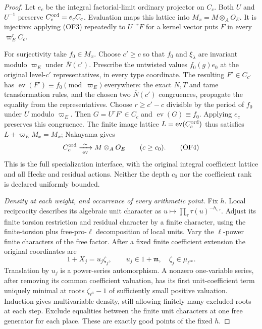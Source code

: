 \begin{proof}
Let $e_c$ be the integral factorial-limit ordinary projector on $C_c$.
Both $U$ and $U^{-1}$ preserve $C_c^{\rm ord}=e_cC_c$.
Evaluation maps this lattice into $M_x=M\otimes_A O_E$.  It is
injective: applying (OF3) repeatedly to $U^{-r}F$ for a kernel vector
puts $F$ in every $\varpi_E^rC_c$.

For surjectivity take $f_0\in M_x$.  Choose $c'\ge c$ so that
$f_0$ and $\xi_\lambda$ are invariant modulo $\varpi_E$ under
$\overline N(c')$.  Prescribe the untwisted values $f_0(g)e_0$
at the original level-$c'$ representatives, in every type coordinate.
The resulting $F'\in C_{c'}$ has
$\operatorname{ev}(F')\equiv f_0\pmod{\varpi_E}$ everywhere:
the exact $N,T$ and tame transformation rules, and the chosen two
$\overline N(c')$ congruences, propagate the equality from the
representatives.  Choose $r\ge c'-c$ divisible by the period of
$f_0$ under $U$ modulo $\varpi_E$.  Then $G=U^rF'\in C_c$ and
$\operatorname{ev}(G)\equiv f_0$.  Applying $e_c$ preserves this
congruence.  The finite image lattice $L=\operatorname{ev}(C_c^{\rm ord})$
thus satisfies $L+\varpi_E M_x=M_x$; Nakayama gives
\[
       C_c^{\rm ord}\xrightarrow[\operatorname{ev}]{\ \sim\ }
                     M\otimes_A O_E\qquad(c\ge c_0).             \tag{OF4}
\]
This is the full specialization interface, with the original integral
coefficient lattice and all Hecke and residual actions.  Neither
the depth $c_0$ nor the coefficient rank is declared uniformly bounded.

\emph{Density at each weight, and occurrence of every arithmetic point.}
Fix $h$.  Local reciprocity describes its algebraic unit character
as $u\mapsto\prod_\tau\tau(u)^{-h_{i,\tau}}$.  Adjust its finite
torsion restriction and residual character by a finite character,
using the finite-torsion plus free-pro-$\ell$ decomposition of local
units.  Vary the $\ell$-power finite characters of the free factor.
After a fixed finite coefficient extension the original coordinates are
\[
          1+X_j=u_j\zeta_j,\qquad
 u_j\in1+\mathfrak m,\quad\zeta_j\in\mu_{\ell^\infty}.           \tag{OF5}
\]
Translation by $u_j$ is a power-series automorphism.  A nonzero
one-variable series, after removing its common coefficient valuation,
has its first unit-coefficient term uniquely minimal at roots
$\zeta_{\ell^a}-1$ of sufficiently small positive valuation.
Induction gives multivariable density, still allowing finitely many
excluded roots at each step.  Exclude equalities between the finite
unit characters at one free generator for each place.  These are
exactly good points of the fixed $h$.


\end{proof}

